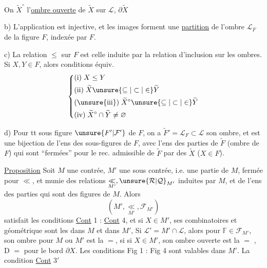 On   $\widetilde X^\circ$ l'\uline{ombre ouverte} de $\widetilde X$ sur $\mathcal L$, $\partial\widetilde X$  

b) L'application
est injective, et  les images forment une \uline{partition} de l'ombre $\mathcal L_F$ de la figure $F$, indexée par $F$.

c)  La relation $\leq$ sur $F$ est celle induite par la relation d'inclusion sur les ombres. Si $X,Y\in F$, alors conditions équiv.
\[
\left\{\begin{aligned}
&\text{(i)}\;X\leq Y\\
&\text{(ii)}\;\widetilde X\unsure{\subseteq|\subset|\in}\widetilde Y\\
&\text{(\unsure{iii})}\;\widetilde X^\circ\unsure{\subseteq|\subset|\in}\widetilde Y\\
&\text{(iv)}\;\widetilde X^\circ\cap\widetilde Y\neq\varnothing
\end{aligned}\right.
\]

d)  Pour tt sous figure $\unsure{F'|\mathcal F'}$ de $F$, on a  $\widetilde F'=\mathcal L_F\subset \mathcal L$ son ombre, et
est une bijection de l'ens des sous-figures de $F$, avec l'ens des parties de $\widetilde F$ (ombre de $F$) qui sont ``fermées'' pour le rec. admissible de $\widetilde F$ par  des $\widetilde X$ ($X\in F$).

\uline{Proposition} Soit $M$ une contrée, $M'$ une sous contrée,  i.e. une partie de $M$, fermée pour $\ll$, et munie des relations $\underset{M'}{\ll},\unsure{\mathcal R|\mathcal Q}_{M'}$ induites par $M$, et de l'ens  des parties   qui sont des figures de $M$. Alors
\[
(M',\underset{M'}{\ll},\mathcal F_{M'})
\]
satisfait les conditions \uline{Cont} 1 : \uline{Cont} 4, et si $X\in M'$, ses  combinatoires et géométrique sont les  dans $M$ et dans $M'$, Si $\mathcal L'=M'\cap \mathcal L$, alors pour  $\mathbb F\in\mathcal F_{M'}$, son ombre  pour $M$ ou $M'$ est la $=$, si si $X\in M'$,  son ombre ouverte est la $=$ , D $=$ pour le bord $\partial X$. Les conditions Fig 1 : Fig 4 sont valables dans $M'$. La condition \uline{Cont} $3'$  

